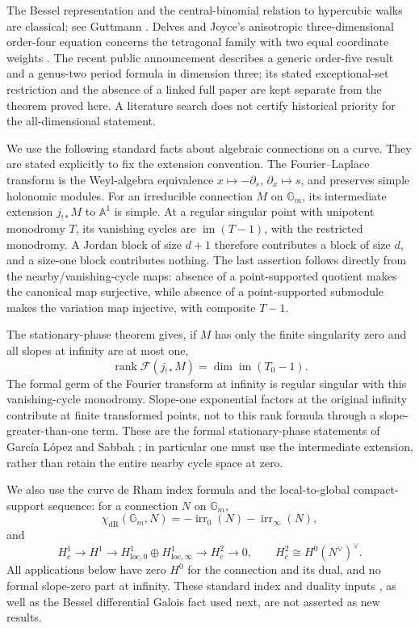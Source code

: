 \documentclass[11pt,a4paper]{article}
\theoremstyle{definition}
\theoremstyle{remark}
\numberwithin{equation}{section}
\begin{document}
The Bessel representation and the central-binomial relation to
hypercubic walks are classical; see Guttmann \cite{p5:BG_Guttmann2010}.
Delves and Joyce's anisotropic three-dimensional order-four equation
concerns the tetragonal family with two equal coordinate weights
\cite{p5:BG_DelvesJoyce2001}.  The recent public announcement
\cite{p5:BG_WatsonAnnouncement} describes a generic order-five result
and a genus-two period formula in dimension three; its stated
exceptional-set restriction and the absence of a linked full paper
are kept separate from the theorem proved here.  A literature
search does not certify historical priority for the all-dimensional
statement.

We use the following standard facts about algebraic connections on
a curve.  They are stated explicitly to fix the extension convention.
The Fourier--Laplace transform is the Weyl-algebra equivalence
$x\mapsto-\partial_s$, $\partial_x\mapsto s$, and preserves simple
holonomic modules.  For an irreducible connection $M$ on
$\mathbb G_m$, its intermediate extension $j_{!*}M$ to
$\mathbb A^1$ is simple.  At a regular singular point with unipotent
monodromy $T$, its vanishing cycles are $\operatorname{im}(T-1)$,
with the restricted monodromy.  A Jordan block of size $d+1$
therefore contributes a block of size $d$, and a size-one block
contributes nothing.  The last assertion follows directly from the
nearby/vanishing-cycle maps: absence of a point-supported quotient
makes the canonical map surjective, while absence of a point-supported
submodule makes the variation map injective, with composite $T-1$.

The stationary-phase theorem gives, if $M$ has only the finite
singularity zero and all slopes at infinity are at most one,
\begin{equation}\label{p6:bg:Fourierfact}
 \operatorname{rank}\mathcal F(j_{!*}M)
       =\dim\operatorname{im}(T_0-1).
\end{equation}
The formal germ of the Fourier transform at infinity is regular
singular with this vanishing-cycle monodromy.  Slope-one exponential
factors at the original infinity contribute at finite transformed
points, not to this rank formula through a slope-greater-than-one
term.  These are the formal stationary-phase statements of
Garc\'ia L\'opez and Sabbah
\cite{p5:BG_GarciaLopez2004,p5:BG_Sabbah2008}; in particular one must use
the intermediate extension, rather than retain the entire nearby
cycle space at zero.

We also use the curve de Rham index formula and the local-to-global
compact-support sequence: for a connection $N$ on $\mathbb G_m$,
\[
 \chi_{\mathrm{dR}}(\mathbb G_m,N)
             =-\operatorname{irr}_0(N)-\operatorname{irr}_\infty(N),
\]
and
\[
 H_c^1\longrightarrow H^1\longrightarrow
 H^1_{\mathrm{loc},0}\oplus H^1_{\mathrm{loc},\infty}
                   \longrightarrow H_c^2\longrightarrow0,
 \qquad H_c^2\cong H^0(N^\vee)^\vee.
\]
All applications below have zero $H^0$ for the connection and its
dual, and no formal slope-zero part at infinity.  These standard
index and duality inputs \cite{p5:BG_Malgrange1991}, as well as the Bessel differential Galois
fact used next, are not asserted as new results.
\end{document}
